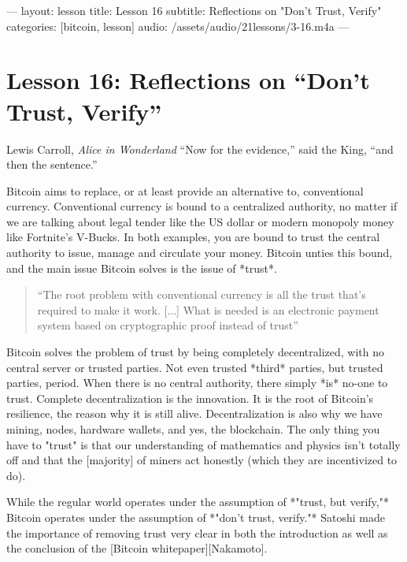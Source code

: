 ---
layout: lesson
title: Lesson 16
subtitle: Reflections on "Don't Trust, Verify"
categories: [bitcoin, lesson]
audio: /assets/audio/21lessons/3-16.m4a
---

\chapter{Lesson 16: Reflections on ``Don't Trust, Verify''}
\label{les:16}

\begin{chapquote}{Lewis Carroll, \textit{Alice in Wonderland}}
``Now for the evidence,'' said the King, ``and then the sentence.''
\end{chapquote}

Bitcoin aims to replace, or at least provide an alternative to,
conventional currency. Conventional currency is bound to a centralized
authority, no matter if we are talking about legal tender like the US
dollar or modern monopoly money like Fortnite's V-Bucks. In both
examples, you are bound to trust the central authority to issue, manage
and circulate your money. Bitcoin unties this bound, and the main issue
Bitcoin solves is the issue of *trust*.

\begin{quotation}
``The root problem with conventional currency is all the trust that's
required to make it work. [...] What is needed is an electronic
payment system based on cryptographic proof instead of trust''
\end{quotation}

Bitcoin solves the problem of trust by being completely decentralized,
with no central server or trusted parties. Not even trusted *third*
parties, but trusted parties, period. When there is no central
authority, there simply *is* no-one to trust. Complete decentralization
is the innovation. It is the root of Bitcoin's resilience, the reason
why it is still alive. Decentralization is also why we have mining,
nodes, hardware wallets, and yes, the blockchain. The only thing you
have to "trust" is that our understanding of mathematics and physics
isn't totally off and that the [majority] of miners act honestly (which
they are incentivized to do).

While the regular world operates under the assumption of *"trust, but
verify,"* Bitcoin operates under the assumption of *"don't trust,
verify."* Satoshi made the importance of removing trust very clear in
both the introduction as well as the conclusion of the [Bitcoin
whitepaper][Nakamoto].

